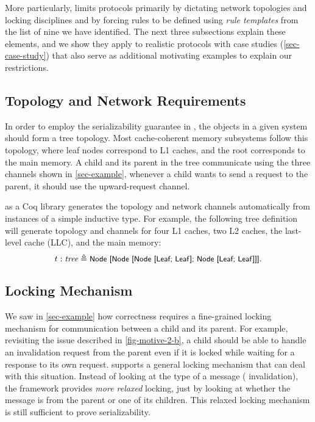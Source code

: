 \documentclass[sigplan,10pt,review,anonymous,screen]{acmart}\settopmatter{printfolios=true,printccs=false,printacmref=false}
\begin{document}
More particularly, \hemiola{} limits protocols primarily by dictating network topologies and locking disciplines and by forcing rules to be defined using \emph{rule templates} from the list of nine we have identified.
The next three subsections explain these elements, and we show they apply to realistic protocols with case studies (\autoref{sec-case-study}) that also serve as additional motivating examples to explain our restrictions.

\subsection{Topology and Network Requirements}

In order to employ the serializability guarantee in \hemiola{}, the objects in a given system should form a tree topology.
Most cache-coherent memory subsystems follow this topology, where leaf nodes correspond to L1 caches, and the root corresponds to the main memory.
A child and its parent in the tree communicate using the three channels shown in \autoref{sec-example}, \eg{} whenever a child wants to send a request to the parent, it should use the upward-request channel.

\hemiola{} as a Coq library generates the topology and network channels automatically from instances of a simple inductive type.
For example, the following tree definition will generate topology and channels for four L1 caches, two L2 caches, the last-level cache (LLC), and the main memory:
\begin{displaymath}
  t : \textit{tree} \triangleq \small{\textsf{Node [Node [Node [Leaf; Leaf]; Node [Leaf; Leaf]]]}}.
\end{displaymath}

\subsection{Locking Mechanism}
\label{sec-locking-mechanism}

We saw in \autoref{sec-example} how correctness requires a fine-grained locking mechanism for communication between a child and its parent.
For example, revisiting the issue described in \autoref{fig-motive-2-b}, a child should be able to handle an invalidation request from the parent even if it is locked while waiting for a response to its own request.
\hemiola{} supports a general locking mechanism that can deal with this situation.
Instead of looking at the type of a message (\eg{} invalidation), the framework provides \emph{more relaxed} locking, just by looking at whether the message is from the parent or one of its children.
This relaxed locking mechanism is still sufficient to prove serializability.
\end{document}
